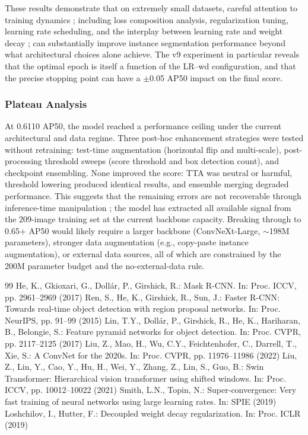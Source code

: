 \documentclass[12pt, a4paper]{article}
\begin{document}
These results demonstrate that on extremely small datasets, careful attention to training dynamics ; including loss composition analysis, regularization tuning, learning rate scheduling, and the interplay between learning rate and weight decay ; can substantially improve instance segmentation performance beyond what architectural choices alone achieve. The v9 experiment in particular reveals that the optimal epoch is itself a function of the LR–wd configuration, and that the precise stopping point can have a $\pm$0.05 AP50 impact on the final score.

\subsubsection{Plateau Analysis}
At 0.6110 AP50, the model reached a performance ceiling under the current architectural and data regime. Three post-hoc enhancement strategies were tested without retraining: test-time augmentation (horizontal flip and multi-scale), post-processing threshold sweeps (score threshold and box detection count), and checkpoint ensembling. None improved the score: TTA was neutral or harmful, threshold lowering produced identical results, and ensemble merging degraded performance. This suggests that the remaining errors are not recoverable through inference-time manipulation ; the model has extracted all available signal from the 209-image training set at the current backbone capacity. Breaking through to 0.65+ AP50 would likely require a larger backbone (ConvNeXt-Large, $\sim$198M parameters), stronger data augmentation (e.g., copy-paste instance augmentation), or external data sources, all of which are constrained by the 200M parameter budget and the no-external-data rule.

\newpage
\begin{thebibliography}{99}
 He, K., Gkioxari, G., Doll\'{a}r, P., Girshick, R.: Mask R-CNN. In: Proc. ICCV, pp. 2961--2969 (2017)
 Ren, S., He, K., Girshick, R., Sun, J.: Faster R-CNN: Towards real-time object detection with region proposal networks. In: Proc. NeurIPS, pp. 91--99 (2015)
 Lin, T.Y., Doll\'{a}r, P., Girshick, R., He, K., Hariharan, B., Belongie, S.: Feature pyramid networks for object detection. In: Proc. CVPR, pp. 2117--2125 (2017)
 Liu, Z., Mao, H., Wu, C.Y., Feichtenhofer, C., Darrell, T., Xie, S.: A ConvNet for the 2020s. In: Proc. CVPR, pp. 11976--11986 (2022)
 Liu, Z., Lin, Y., Cao, Y., Hu, H., Wei, Y., Zhang, Z., Lin, S., Guo, B.: Swin Transformer: Hierarchical vision transformer using shifted windows. In: Proc. ICCV, pp. 10012--10022 (2021)
 Smith, L.N., Topin, N.: Super-convergence: Very fast training of neural networks using large learning rates. In: SPIE (2019)
 Loshchilov, I., Hutter, F.: Decoupled weight decay regularization. In: Proc. ICLR (2019)
\end{thebibliography}
\end{document}
